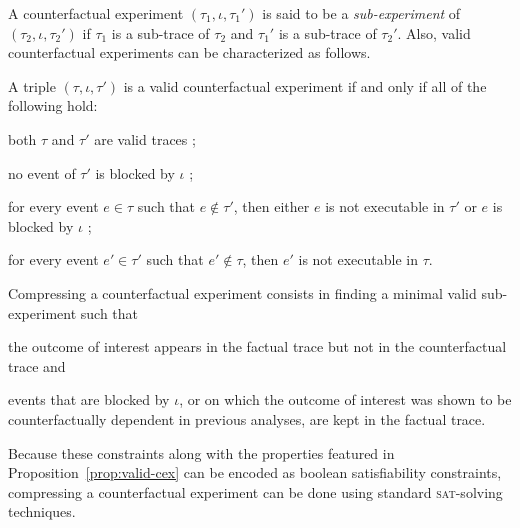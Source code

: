 A counterfactual experiment $(\tau_1, \iota, \tau_1')$ is said to be a
\emph{sub-experiment} of $(\tau_2, \iota, \tau_2')$ if $\tau_1$ is a
sub-trace of $\tau_2$ and $\tau_1'$ is a sub-trace of $\tau_2'$. Also,
valid counterfactual experiments can be characterized as follows.

\begin{proposition}%
  \label{prop:valid-cex}
  A triple $(\tau, \iota, \tau')$ is a valid counterfactual experiment
  if and only if all of the following hold:
  \begin{inparaenum}[(1)]
  \item \label{valid-cex:valid-traces} both $\tau$ and $\tau'$ are
    valid traces ;
  \item \label{valid-cex:no-blocking} no event of $\tau'$ is blocked
    by $\iota$ ;
  \item \label{valid-cex:co-occur} for every event $e \in \tau$ such
    that $e \notin \tau'$, then either $e$ is not executable in
    $\tau'$ or $e$ is blocked by $\iota$ ;
  \item \label{valid-cex:co-occur2} for every event $e' \in \tau'$
    such that $e' \notin \tau$, then $e'$ is not executable in $\tau$.
  \end{inparaenum}
\end{proposition}

\noindent Compressing a counterfactual experiment consists in finding
a minimal valid sub-experiment such that
\begin{inparaenum}[(i)]
\item the outcome of interest appears in the factual trace but not in
  the counterfactual trace and
\item events that are blocked by $\iota$, or on which the outcome of
  interest was shown to be counterfactually dependent in previous
  analyses, are kept in the factual trace.
\end{inparaenum}
Because these constraints along with the properties featured in
Proposition~\ref{prop:valid-cex} can be encoded as boolean
satisfiability constraints, compressing a counterfactual experiment
can be done using standard \textsc{sat}-solving techniques.

